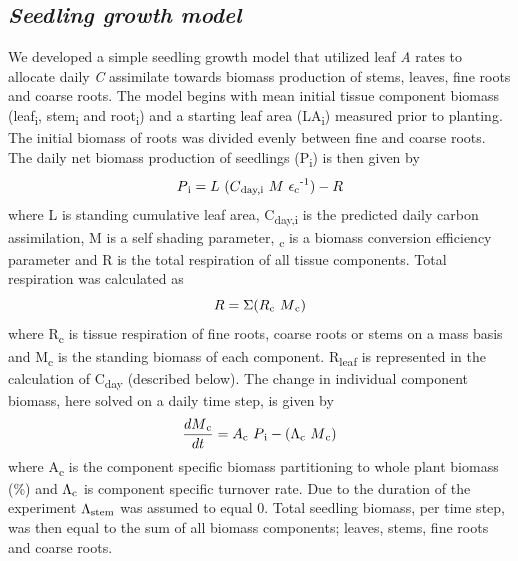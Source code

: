 \documentclass[a4paper]{article}\usepackage[]{graphicx}\usepackage[]{color}
\begin{document}
\subsection*{\textit{Seedling growth model}}
We developed a simple seedling growth model that utilized leaf \textit{A} rates to allocate daily \textit{C} assimilate towards biomass production of stems, leaves, fine roots and coarse roots. The model begins with mean initial tissue component biomass (leaf\textsubscript{i}, stem\textsubscript{i} and root\textsubscript{i}) and a starting leaf area (LA\textsubscript{i}) measured prior to planting. The initial biomass of roots was divided evenly between fine and coarse roots. The daily net biomass production of seedlings (P\textsubscript{i}) is then given by
\begin{equation} P\textsubscript{i}=L~(C\textsubscript{day,i}~M~\epsilon\textsubscript{c}\textsuperscript{-1})-R
\label{eq:prod}
\end{equation}
where L is standing cumulative leaf area, C\textsubscript{day,i} is the predicted daily carbon assimilation, M is a self shading parameter, \textepsilon\textsubscript{c} is a biomass conversion efficiency parameter and R is the total respiration of all tissue components. Total respiration was calculated as 
\begin{equation} R=\Sigma(R\textsubscript{c}~M\textsubscript{c})
\label{eq:resp}
\end{equation}
where R\textsubscript{c} is tissue respiration of fine roots, coarse roots or stems on a mass basis and M\textsubscript{c} is the standing biomass of each component. R\textsubscript{leaf} is represented in the calculation of C\textsubscript{day} (described below). The change in individual component biomass, here solved on a daily time step, is given by
\begin{equation} \frac{dM\textsubscript{c}}{dt}=A\textsubscript{c}~P\textsubscript{i}-(\Lambda\textsubscript{c}~M\textsubscript{c})
\label{eq:mass}
\end{equation}
where A\textsubscript{c} is the component specific biomass partitioning  to whole plant biomass (\%) and $\Lambda\textsubscript{c}$ is component specific turnover rate. Due to the duration of the experiment $\Lambda\textsubscript{stem}$ was assumed to equal 0.  Total seedling biomass, per time step, was then equal to the sum of all biomass components; leaves, stems, fine roots and coarse roots. 
\end{document}
